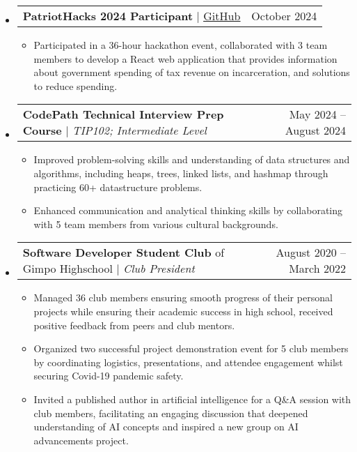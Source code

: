 \documentclass[letterpaper,11pt]{article}
\makeatletter
\newcommand{\resumeItem}[1]{
  \item\small{
    {#1 \vspace{-3pt}}
  }
}
\newcommand{\resumeProjectHeading}[2]{
    \item
    \begin{tabular*}{0.97\textwidth}{l@{\extracolsep{\fill}}r@{\hspace{-0.2in}}}
        \small#1 & #2 \\
    \end{tabular*}\vspace{-7pt}
}
\newcommand{\resumeSubHeadingListStart}{\begin{itemize}[leftmargin=0.00in, rightmargin=-0.2in, label={}]}
\newcommand{\resumeSubHeadingListEnd}{\end{itemize}}
\newcommand{\resumeItemListStart}{\begin{itemize}[leftmargin=0.15in, rightmargin=0.15in]}
\newcommand{\resumeItemListEnd}{\end{itemize}\vspace{-7pt}}
\makeatother
\begin{document}
    \resumeSubHeadingListStart
        \resumeProjectHeading
            {\textbf{PatriotHacks 2024 Participant} $|$ \href{https://github.com/juhun32/Prison-Break}{\underline{GitHub}}}{October 2024}
            \resumeItemListStart
                \resumeItem{Participated in a 36-hour hackathon event, collaborated with 3 team members to develop a React web application that provides information about government spending of tax revenue on incarceration, and solutions to reduce spending.}
                \resumeItemListEnd
        \resumeSubHeadingListEnd

    \resumeSubHeadingListStart
        \resumeProjectHeading
            {\textbf{CodePath Technical Interview Prep Course} $|$ \emph{TIP102; Intermediate Level}}{May 2024 -- August 2024}
            \resumeItemListStart
                \resumeItem{Improved problem-solving skills and understanding of data structures and algorithms, including heaps, trees, linked lists, and hashmap through practicing 60+ datastructure problems.}
                \resumeItem{Enhanced communication and analytical thinking skills by collaborating with 5 team members from various cultural backgrounds.}
                \resumeItemListEnd
        \resumeSubHeadingListEnd

    \resumeSubHeadingListStart
        \resumeProjectHeading
            {\textbf{Software Developer Student Club} of Gimpo Highschool $|$ \emph{Club President}}{August 2020 -- March 2022}
            \resumeItemListStart
                \resumeItem{Managed 36 club members ensuring smooth progress of their personal projects while ensuring their academic success in high school, received positive feedback from peers and club mentors.}
                \resumeItem{Organized two successful project demonstration event for 5 club members by coordinating logistics, presentations, and attendee engagement whilst securing Covid-19 pandemic safety.}
                \resumeItem{Invited a published author in artificial intelligence for a Q\&A session with club members, facilitating an engaging discussion that deepened understanding of AI concepts and inspired a new group on AI advancements project.}
            \resumeItemListEnd
        \resumeSubHeadingListEnd
\end{document}
